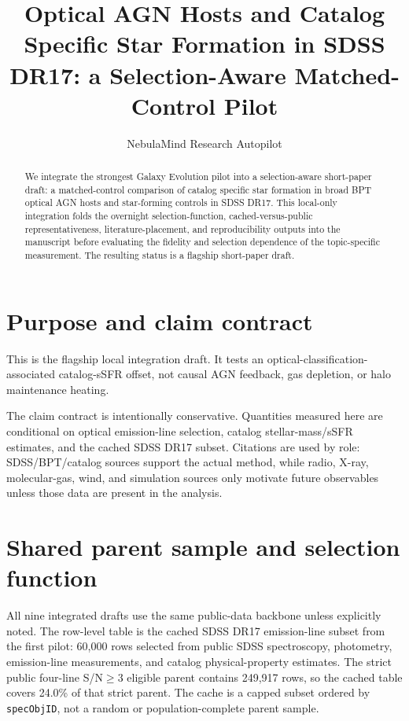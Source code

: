 \documentclass[twocolumn]{aastex702}
\begin{document}
\title{Optical AGN Hosts and Catalog Specific Star Formation in SDSS DR17: a Selection-Aware Matched-Control Pilot}
\author{NebulaMind Research Autopilot}

\begin{abstract}
We integrate the strongest Galaxy Evolution pilot into a selection-aware short-paper draft: a matched-control comparison of catalog specific star formation in broad BPT optical AGN hosts and star-forming controls in SDSS DR17. This local-only integration folds the overnight selection-function, cached-versus-public representativeness, literature-placement, and reproducibility outputs into the manuscript before evaluating the fidelity and selection dependence of the topic-specific measurement. The resulting status is a flagship short-paper draft.
\end{abstract}


\section{Purpose and claim contract}\label{sec:purpose}
This is the flagship local integration draft. It tests an optical-classification-associated catalog-sSFR offset, not causal AGN feedback, gas depletion, or halo maintenance heating.

The claim contract is intentionally conservative. Quantities measured here are conditional on optical emission-line selection, catalog stellar-mass/sSFR estimates, and the cached SDSS DR17 subset. Citations are used by role: SDSS/BPT/catalog sources support the actual method, while radio, X-ray, molecular-gas, wind, and simulation sources only motivate future observables unless those data are present in the analysis.


\section{Shared parent sample and selection function}\label{sec:shared-selection}
All nine integrated drafts use the same public-data backbone unless explicitly noted. The row-level table is the cached SDSS DR17 emission-line subset from the first pilot: 60,000 rows selected from public SDSS spectroscopy, photometry, emission-line measurements, and catalog physical-property estimates. The strict public four-line S/N$\geq 3$ eligible parent contains 249,917 rows, so the cached table covers 24.0\% of that strict parent. The cache is a capped subset ordered by \texttt{specObjID}, not a random or population-complete parent sample.
\end{document}
